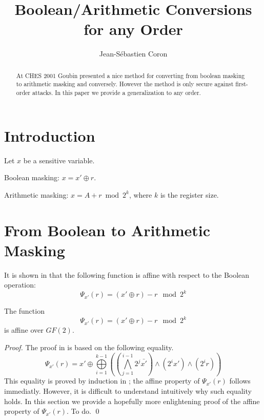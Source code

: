 \documentclass[11pt]{llncs}
\begin{document}
\title{Boolean/Arithmetic Conversions  for any Order}

\author{
Jean-S\'ebastien Coron}

\institute{~}

\maketitle

\begin{abstract}
At CHES 2001 Goubin presented a nice method for converting from boolean
masking to arithmetic masking and conversely. However the method is
only secure against first-order attacks. In this paper we provide a
generalization to any order.
\end{abstract}

\section{Introduction}

Let $x$ be a sensitive variable. 

Boolean masking: $x=x' \oplus r$.

Arithmetic masking: $x=A+ r \bmod 2^k$, where $k$ is the register
size.


\section{From Boolean to Arithmetic Masking}

It is shown in \cite{goubin} that the following function is affine
with respect to the Boolean operation:
$$ \Psi_{x'}(r) = (x' \oplus r) -r \mod 2^k$$

\begin{theorem}
The function $$ \Psi_{x'}(r) = (x' \oplus r) -r \mod 2^k$$ is affine
over $GF(2)$.
\end{theorem}

\begin{proof}
The proof in \cite{goubin} is based on the following equality.
$$ \Psi_{x'}(r)=x' \oplus \bigoplus\limits_{i=1}^{k-1} \left( \left(
\bigwedge\limits_{j=1}^{i-1} 2^j \bar{x'} \right) \wedge (2^i x') \wedge
(2^i r) \right)$$
This equality is proved by induction in \cite{goubin}; the affine
property of $\Psi_{x'}(r)$ follows immediatly.  However, it is
difficult to understand intuitively why such equality holds. In this
section we provide a hopefully more enlightening  proof of the affine
property of $\Psi_{x'}(r)$. To do.
\qed
 \end{proof}
\end{document}
